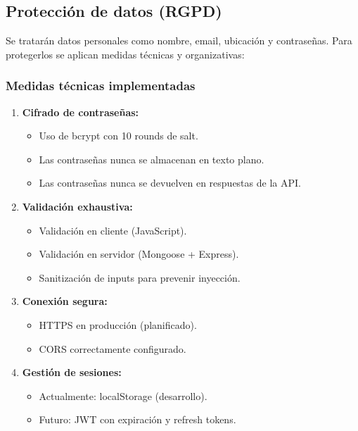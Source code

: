 \documentclass[12pt,a4paper]{article}
\begin{document}
\subsection{Protección de datos (RGPD)}

Se tratarán datos personales como nombre, email, ubicación y contraseñas. Para protegerlos se aplican medidas técnicas y organizativas:

\subsubsection{Medidas técnicas implementadas}

\begin{enumerate}
    \item \textbf{Cifrado de contraseñas:}
    \begin{itemize}
        \item Uso de bcrypt con 10 rounds de salt.
        \item Las contraseñas nunca se almacenan en texto plano.
        \item Las contraseñas nunca se devuelven en respuestas de la API.
    \end{itemize}
    
    \item \textbf{Validación exhaustiva:}
    \begin{itemize}
        \item Validación en cliente (JavaScript).
        \item Validación en servidor (Mongoose + Express).
        \item Sanitización de inputs para prevenir inyección.
    \end{itemize}
    
    \item \textbf{Conexión segura:}
    \begin{itemize}
        \item HTTPS en producción (planificado).
        \item CORS correctamente configurado.
    \end{itemize}
    
    \item \textbf{Gestión de sesiones:}
    \begin{itemize}
        \item Actualmente: localStorage (desarrollo).
        \item Futuro: JWT con expiración y refresh tokens.
    \end{itemize}
\end{enumerate}
\end{document}

